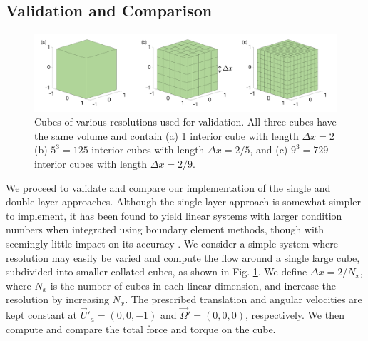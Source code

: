 	\subsection{Validation and Comparison}
	\label{sec:bie_validataion}
\begin{figure}[ht]
	\begin{center}
		\includegraphics[scale=0.45]{./figures/fig_cube_all_dx}
	\end{center}
	\caption{Cubes of various resolutions used for validation. All three cubes have the same volume and contain (a) 1 interior cube with length $\Delta x = 2$ (b) $5^3=125$  interior cubes with length $\Delta x = 2/5$, and (c) $9^3 = 729$  interior cubes with length $\Delta x = 2/9$.}
	\label{fig_test_cubes}
\end{figure}
We proceed to validate and compare our implementation of the single and double-layer approaches. Although the single-layer approach is somewhat simpler to implement, it has been found to yield linear systems with larger condition numbers when integrated using boundary element methods, though with seemingly little impact on its accuracy \cite{youngren_stokes_1975,ingber_comparison_1999}.
We consider a simple system where resolution may easily be varied and compute the flow around a single large cube, subdivided into smaller collated cubes, as shown in Fig. \ref{fig_test_cubes}.
We define $\Delta x  = 2 / N_x$, where $N_x$ is the number of cubes in each linear dimension, and increase the resolution by increasing $N_x$.
The prescribed translation and angular velocities are kept constant at $\vec{U}'_a = (0,0,-1)$ and $\vec{\Omega}'= (0,0,0)$, respectively. We then compute and compare the total force and torque on the cube. 
\par
